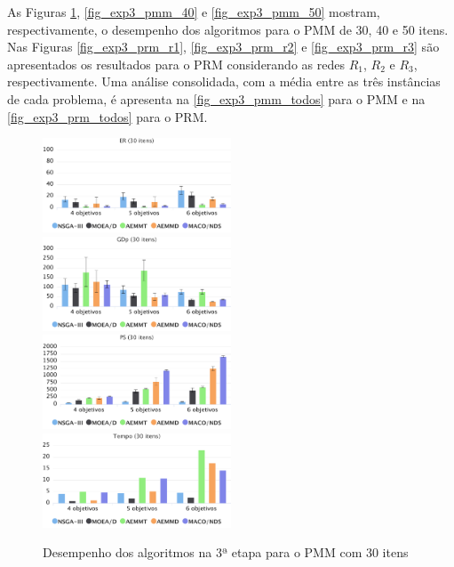 As Figuras \ref{fig_exp3_pmm_30}, \ref{fig_exp3_pmm_40} e \ref{fig_exp3_pmm_50} mostram, respectivamente, o desempenho dos algoritmos para o PMM de 30, 40 e 50 itens. Nas Figuras \ref{fig_exp3_prm_r1}, \ref{fig_exp3_prm_r2} e \ref{fig_exp3_prm_r3} são apresentados os resultados para o PRM considerando as redes $R_1$, $R_2$ e $R_3$, respectivamente. Uma análise consolidada, com a média entre as três instâncias de cada problema, é apresenta na \autoref{fig_exp3_pmm_todos} para o PMM e na \autoref{fig_exp3_prm_todos} para o PRM.

\begin{figure}[!htbp]	
	\includegraphics[width=0.5\textwidth]{cap_experimentos/figs/etapa3/er-mkp-30}
	\includegraphics[width=0.5\textwidth]{cap_experimentos/figs/etapa3/gd-mkp-30}
	\includegraphics[width=0.5\textwidth]{cap_experimentos/figs/etapa3/ps-mkp-30}
	\includegraphics[width=0.5\textwidth]{cap_experimentos/figs/etapa3/time-mkp-30}
	\caption{\label{fig_exp3_pmm_30}Desempenho dos algoritmos na 3ª etapa para o PMM com 30 itens}
\end{figure}

